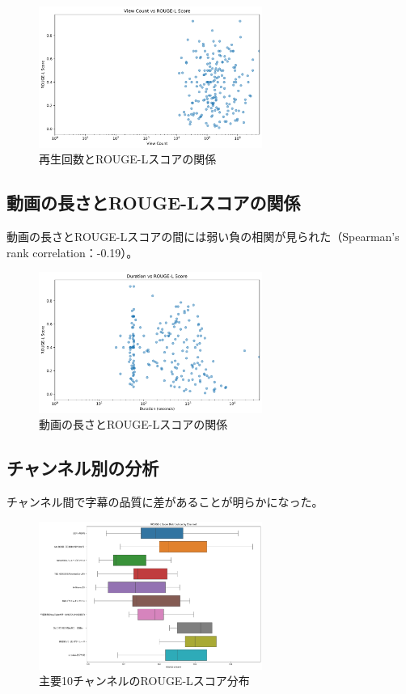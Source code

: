 \documentclass[11pt, a4paper]{ltjsarticle}
\begin{document}
\begin{figure}[htbp]
  \centering
  \includegraphics[width=0.65\textwidth]{../results/img/view_count_vs_rouge_score.png}
  \caption{再生回数とROUGE-Lスコアの関係}
\end{figure}

\subsection{動画の長さとROUGE-Lスコアの関係}
動画の長さとROUGE-Lスコアの間には弱い負の相関が見られた（Spearman's rank correlation：-0.19）。

\begin{figure}[htbp]
  \centering
  \includegraphics[width=0.65\textwidth]{../results/img/duration_vs_rouge_score.png}
  \caption{動画の長さとROUGE-Lスコアの関係}
\end{figure}

\subsection{チャンネル別の分析}
チャンネル間で字幕の品質に差があることが明らかになった。

\begin{figure}[htbp]
  \centering
  \includegraphics[width=0.65\textwidth]{../results/img/rouge_l_boxplot_by_channel.png}
  \caption{主要10チャンネルのROUGE-Lスコア分布}
\end{figure}
\end{document}
